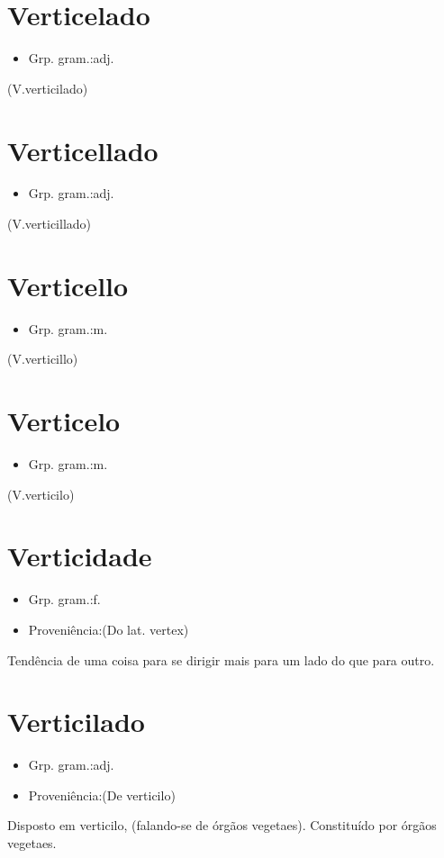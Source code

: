 \documentclass{article}
\begin{document}
\section{Verticelado}
\begin{itemize}
\item {Grp. gram.:adj.}
\end{itemize}
(V.verticilado)
\section{Verticellado}
\begin{itemize}
\item {Grp. gram.:adj.}
\end{itemize}
(V.verticillado)
\section{Verticello}
\begin{itemize}
\item {Grp. gram.:m.}
\end{itemize}
(V.verticillo)
\section{Verticelo}
\begin{itemize}
\item {Grp. gram.:m.}
\end{itemize}
(V.verticilo)
\section{Verticidade}
\begin{itemize}
\item {Grp. gram.:f.}
\end{itemize}
\begin{itemize}
\item {Proveniência:(Do lat. \textunderscore vertex\textunderscore )}
\end{itemize}
Tendência de uma coisa para se dirigir mais para um lado do que para outro.
\section{Verticilado}
\begin{itemize}
\item {Grp. gram.:adj.}
\end{itemize}
\begin{itemize}
\item {Proveniência:(De \textunderscore verticilo\textunderscore )}
\end{itemize}
Disposto em verticilo, (falando-se de órgãos vegetaes).
Constituído por órgãos vegetaes.
\end{document}
